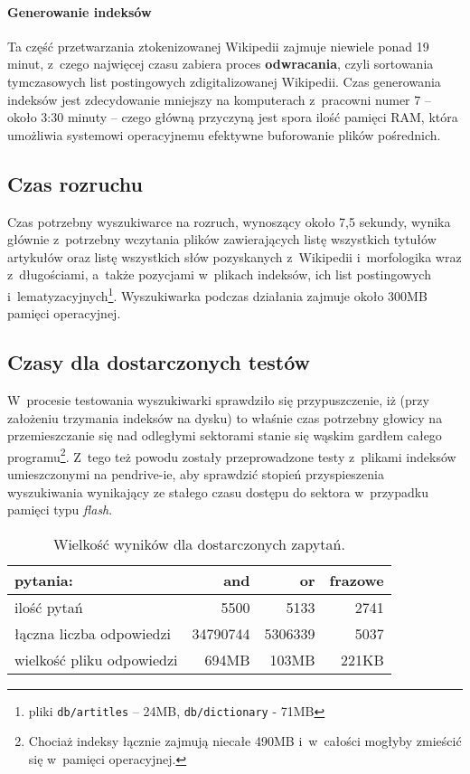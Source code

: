 \documentclass[a4paper,12pt]{article}
\begin{document}
\paragraph{Generowanie indeksów}
Ta część przetwarzania ztokenizowanej Wikipedii zajmuje niewiele ponad 19
minut, z~czego najwięcej czasu zabiera proces \textbf{odwracania}, czyli
sortowania tymczasowych list postingowych zdigitalizowanej Wikipedii. Czas
generowania indeksów jest zdecydowanie mniejszy na komputerach z~pracowni numer
7 -- około 3:30 minuty -- czego główną przyczyną jest spora ilość pamięci RAM,
która umożliwia systemowi operacyjnemu efektywne buforowanie plików pośrednich.

\subsection{Czas rozruchu}
Czas potrzebny wyszukiwarce na rozruch, wynoszący około 7,5 sekundy, wynika
głównie z~potrzebny wczytania plików zawierających listę wszystkich tytułów
artykułów oraz listę wszystkich słów pozyskanych z~Wikipedii i~morfologika wraz
z~długościami, a~także pozycjami w~plikach indeksów, ich list postingowych
i~lematyzacyjnych\footnote{pliki \texttt{db/artitles} -- 24MB,
\texttt{db/dictionary} - 71MB}. Wyszukiwarka podczas działania zajmuje około
300MB pamięci operacyjnej.

\subsection{Czasy dla dostarczonych testów}
W~procesie testowania wyszukiwarki sprawdziło się przypuszczenie, iż (przy
założeniu trzymania indeksów na dysku) to właśnie czas potrzebny głowicy na
przemieszczanie się nad odległymi sektorami stanie się wąskim gardłem
całego programu\footnote{Chociaż indeksy łącznie zajmują niecałe 490MB
i~w~całości mogłyby zmieścić się w~pamięci operacyjnej.}. Z~tego też powodu
zostały przeprowadzone testy z~plikami indeksów umieszczonymi na pendrive-ie,
aby sprawdzić stopień przyspieszenia wyszukiwania wynikający ze stałego czasu
dostępu do sektora w~przypadku pamięci typu \textit{flash}.

\begin{center}
	\begin{table}
		\begin{tabular}[c]{| l || r | r | r |}
		\hline
		pytania: & and & or & frazowe \\ \hline \hline
		ilość pytań & 5500 & 5133 & 2741 \\ \hline
		łączna liczba odpowiedzi & 34790744 & 5306339 & 5037 \\ \hline
		wielkość pliku odpowiedzi & 694MB & 103MB & 221KB \\
		\hline
		\end{tabular}
		\caption{Wielkość wyników dla dostarczonych zapytań.}
	\end{table}
\end{center}
\end{document}
